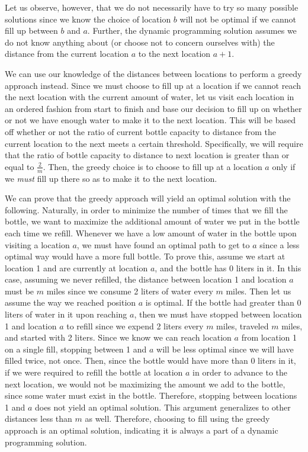 \documentclass[11pt]{article}
\begin{document}
Let us observe, however, that we do not necessarily have to try so many possible solutions since we know the choice of location $b$ will not be optimal if we cannot fill up between $b$ and $a$. Further, the dynamic programming solution assumes we do not know anything about (or choose not to concern ourselves with) the distance from the current location $a$ to the next location $a+1$.

We can use our knowledge of the distances between locations to perform a greedy approach instead. Since we must choose to fill up at a location if we cannot reach the next location with the current amount of water, let us visit each location in an ordered fashion from start to finish and base our decision to fill up on whether or not we have enough water to make it to the next location. This will be based off whether or not the ratio of current bottle capacity to distance from the current location to the next meets a certain threshold. Specifically, we will require that the ratio of bottle capacity to distance to next location is greater than or equal to $\frac{2}{m}$. Then, the greedy choice is to choose to fill up at a location $a$ only if we \textit{must} fill up there so as to make it to the next location.

We can prove that the greedy approach will yield an optimal solution with the following. Naturally, in order to minimize the number of times that we fill the bottle, we want to maximize the additional amount of water we put in the bottle each time we refill. Whenever we have a low amount of water in the bottle upon visiting a location $a$, we must have found an optimal path to get to $a$ since a less optimal way would have a more full bottle. To prove this, assume we start at location 1 and are currently at location $a$, and the bottle has 0 liters in it. In this case, assuming we never refilled, the distance between location 1 and location $a$ must be $m$ miles since we consume 2 liters of water every $m$ miles. Then let us assume the way we reached position $a$ is optimal. If the bottle had greater than 0 liters of water in it upon reaching $a$, then we must have stopped between location 1 and location $a$ to refill since we expend 2 liters every $m$ miles, traveled $m$ miles, and started with 2 liters. Since we know we can reach location $a$ from location 1 on a single fill, stopping between 1 and $a$ will be less optimal since we will have filled twice, not once. Then, since the bottle would have more than 0 liters in it, if we were required to refill the bottle at location $a$ in order to advance to the next location, we would not be maximizing the amount we add to the bottle, since some water must exist in the bottle. Therefore, stopping between locations 1 and $a$ does not yield an optimal solution. This argument generalizes to other distances less than $m$ as well. Therefore, choosing to fill using the greedy approach is an optimal solution, indicating it is always a part of a dynamic programming solution.
\end{document}
